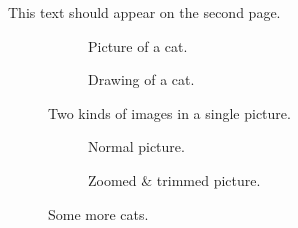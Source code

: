 This text should appear on the second page.

    \begin{figure}
        \centering
        \begin{subfigure}[b]{.5\textwidth}
            \centering
            \Large
            \caption{Picture of a cat.}
        \end{subfigure}%
        \begin{subfigure}[b]{.5\textwidth}
            \centering
            \LARGE
            \caption{Drawing of a cat.}
        \end{subfigure}
        \caption{Two kinds of images in a single picture.}
        \label{fig:cats}
    \end{figure}

    \begin{figure}
        \centering
        \begin{subfigure}[b]{.5\textwidth}
            \centering
            \caption{Normal picture.}
        \end{subfigure}%
        \begin{subfigure}[b]{.5\textwidth}
            \centering
            \caption{Zoomed \& trimmed picture.}
        \end{subfigure}
        \caption{Some more cats.}
        \label{fig:more-cats}
    \end{figure}